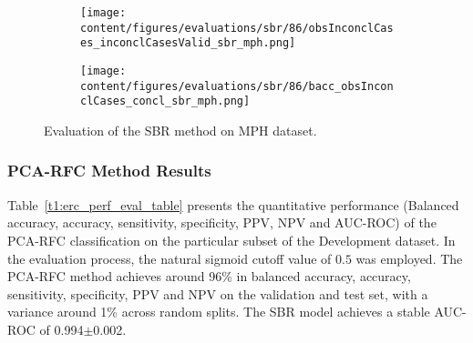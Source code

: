 \begin{figure}[ht]
  \begin{subfigure}{0.9\textwidth}
    \centering
    \texttt{[image: content/figures/evaluations/sbr/86/obsInconclCases\_inconclCasesValid\_sbr\_mph.png]}
    \label{fig:obsInconclCases_inconclCasesValid_sbr_mph}
  \end{subfigure}
  \hfill
  \begin{subfigure}{0.9\textwidth}
    \centering
    \texttt{[image: content/figures/evaluations/sbr/86/bacc\_obsInconclCases\_concl\_sbr\_mph.png]}
    \label{fig:bacc_obsInconclCases_concl_sbr_mph}
  \end{subfigure}
  \caption{Evaluation of the SBR method on MPH dataset.}
  \label{fig:perf_results_sbr_mph}
\end{figure}




\subsubsection{PCA-RFC Method Results}
\label{subsubsec:eval_rfc}




Table~\ref{t1:erc_perf_eval_table} presents the quantitative performance 
(Balanced accuracy, accuracy, sensitivity, specificity, PPV, NPV and AUC-ROC) of the PCA-RFC classification on the 
particular subset of the Development dataset.
In the evaluation process, the natural sigmoid cutoff value of $0.5$ was employed.
The PCA-RFC method achieves around 96\% in balanced accuracy, accuracy, sensitivity, specificity, PPV and NPV 
on the validation and test set, with a variance around 1\% across random splits.
The SBR model achieves a stable AUC-ROC of 0.994$\pm$0.002.


